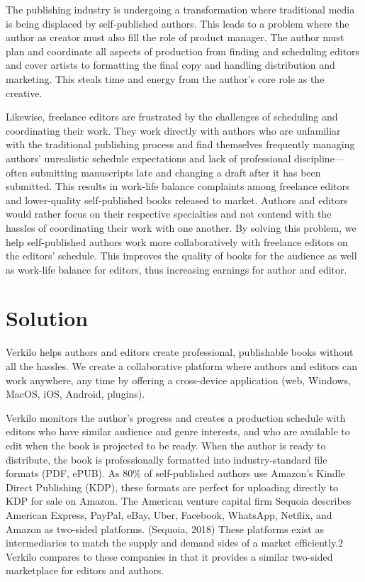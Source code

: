 \documentclass[10pt,openany]{book}
\begin{document}
The publishing industry is undergoing a transformation where traditional
media is being displaced by self-published authors. This leads to a
problem where the author as creator must also fill the role of product
manager. The author must plan and coordinate all aspects of production
from finding and scheduling editors and cover artists to formatting the
final copy and handling distribution and marketing. This steals time and
energy from the author's core role as the creative.

Likewise, freelance editors are frustrated by the challenges of
scheduling and coordinating their work. They work directly with authors
who are unfamiliar with the traditional publishing process and find
themselves frequently managing authors' unrealistic schedule
expectations and lack of professional discipline---often submitting
manuscripts late and changing a draft after it has been submitted. This
results in work-life balance complaints among freelance editors and
lower-quality self-published books released to market. Authors and
editors would rather focus on their respective specialties and not
contend with the hassles of coordinating their work with one another. By
solving this problem, we help self-published authors work more
collaboratively with freelance editors on the editors' schedule. This
improves the quality of books for the audience as well as work-life
balance for editors, thus increasing earnings for author and editor.

\hypertarget{solution}{%
\section{Solution}\label{solution}}

Verkilo helps authors and editors create professional, publishable books
without all the hassles. We create a collaborative platform where
authors and editors can work anywhere, any time by offering a
cross-device application (web, Windows, MacOS, iOS, Android, plugins).

Verkilo monitors the author's progress and creates a production schedule
with editors who have similar audience and genre interests, and who are
available to edit when the book is projected to be ready. When the
author is ready to distribute, the book is professionally formatted into
industry-standard file formats (PDF, ePUB). As 80\% of self-published
authors use Amazon's Kindle Direct Publishing (KDP), these formats are
perfect for uploading directly to KDP for sale on Amazon. The American
venture capital firm Sequoia describes American Express, PayPal, eBay,
Uber, Facebook, WhatsApp, Netflix, and Amazon as two-sided platforms.
(Sequoia, 2018) These platforms exist as intermediaries to match the
supply and demand sides of a market efficiently.2 Verkilo compares to
these companies in that it provides a similar two-sided marketplace for
editors and authors.
\end{document}

